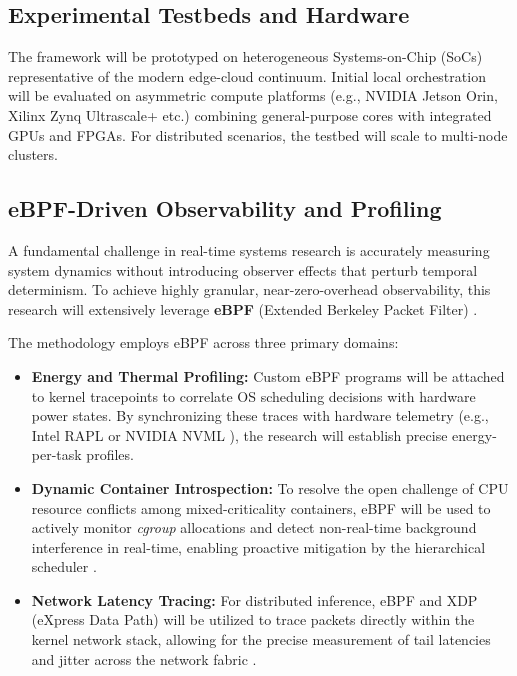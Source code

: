 \documentclass[11pt,a4paper]{article}
\begin{document}
\subsection{Experimental Testbeds and Hardware}
The framework will be prototyped on heterogeneous Systems-on-Chip (SoCs) representative of the modern edge-cloud continuum. Initial local orchestration will be evaluated on asymmetric compute platforms (e.g., NVIDIA Jetson Orin, Xilinx Zynq Ultrascale+ etc.) combining general-purpose cores with integrated GPUs and FPGAs. For distributed scenarios, the testbed will scale to multi-node clusters.

\subsection{eBPF-Driven Observability and Profiling}
A fundamental challenge in real-time systems research is accurately measuring system dynamics without introducing observer effects that perturb temporal determinism. To achieve highly granular, near-zero-overhead observability, this research will extensively leverage \textbf{eBPF} (Extended Berkeley Packet Filter) \cite{gbadamosi2024ebpf, song2024ebpf}.

The methodology employs eBPF across three primary domains:
\begin{itemize}
    \item \textbf{Energy and Thermal Profiling:} Custom eBPF programs will be attached to kernel tracepoints to correlate OS scheduling decisions with hardware power states. By synchronizing these traces with hardware telemetry (e.g., Intel RAPL \cite{khan2018rapl} or NVIDIA NVML \cite{nvml}), the research will establish precise energy-per-task profiles.
    \item \textbf{Dynamic Container Introspection:} To resolve the open challenge of CPU resource conflicts among mixed-criticality containers, eBPF will be used to actively monitor \textit{cgroup} allocations and detect non-real-time background interference in real-time, enabling proactive mitigation by the hierarchical scheduler \cite{cassagnes2020rise, bertinatto2024container}.
    \item \textbf{Network Latency Tracing:} For distributed inference, eBPF and XDP (eXpress Data Path) will be utilized to trace packets directly within the kernel network stack, allowing for the precise measurement of tail latencies and jitter across the network fabric \cite{vieira2020fast}.
\end{itemize}
\end{document}
